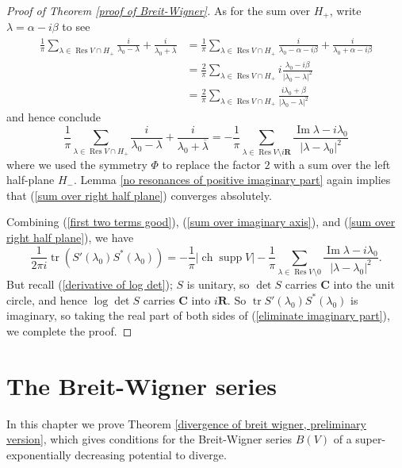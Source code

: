 \documentclass[12pt]{report}
\newcommand{\RR}{\mathbf{R}}
\newcommand{\CC}{\mathbf{C}}
\DeclareMathOperator{\ch}{ch}
\DeclareMathOperator{\Res}{Res}
\DeclareMathOperator{\supp}{supp}
\newcommand{\tr}{\operatorname{tr}}
\renewcommand{\Im}{\operatorname{Im}}
\theoremstyle{definition}
\begin{document}
\begin{proof}[Proof of Theorem \ref{proof of Breit-Wigner}]
As for the sum over $H_+$, write $\lambda = \alpha - i\beta$ to see
\begin{align*}
\frac{1}{\pi} \sum_{\lambda \in \Res V \cap H_+} \frac{i}{\lambda_0 - \lambda} + \frac{i}{\lambda_0 + \overline{\lambda}}
&= \frac{1}{\pi} \sum_{\lambda \in \Res V \cap H_+} \frac{i}{\lambda_0 - \alpha - i\beta} + \frac{i}{\lambda_0 + \alpha - i\beta}\\
&= \frac{2}{\pi} \sum_{\lambda \in \Res V \cap H_+} i\frac{\lambda_0 - i\beta}{|\lambda_0 - \lambda|^2}\\
&= \frac{2}{\pi} \sum_{\lambda \in \Res V \cap H_+} \frac{i\lambda_0 + \beta}{|\lambda_0 - \lambda|^2}
\end{align*}
and hence conclude
\begin{equation}
\label{sum over right half plane}
\frac{1}{\pi} \sum_{\lambda \in \Res V \cap H_+} \frac{i}{\lambda_0 - \lambda} + \frac{i}{\lambda_0 + \overline{\lambda}}
= -\frac{1}{\pi} \sum_{\lambda \in \Res V \setminus i\RR} \frac{\Im \lambda - i\lambda_0}{|\lambda - \lambda_0|^2}
\end{equation}
where we used the symmetry $\Phi$ to replace the factor $2$ with a sum over the left half-plane $H_-$.
Lemma \ref{no resonances of positive imaginary part} again implies that (\ref{sum over right half plane}) converges absolutely.

Combining (\ref{first two terms good}), (\ref{sum over imaginary axis}), and (\ref{sum over right half plane}), we have
\begin{equation}
\label{eliminate imaginary part}
\frac{1}{2\pi i}\tr(S'(\lambda_0)S^*(\lambda_0)) = -\frac{1}{\pi}|\ch \supp V| -\frac{1}{\pi} \sum_{\lambda \in \Res V \setminus 0} \frac{\Im \lambda - i\lambda_0}{|\lambda - \lambda_0|^2}.
   \end{equation}
But recall (\ref{derivative of log det}); $S$ is unitary, so $\det S$ carries $\CC$ into the unit circle, and hence $\log \det S$ carries $\CC$ into $i\RR$.
So $\tr S'(\lambda_0)S^*(\lambda_0)$ is imaginary, so taking the real part of both sides of (\ref{eliminate imaginary part}), we complete the proof.
\end{proof}


\chapter{The Breit-Wigner series}
\label{SED potentials chapter}
In this chapter we prove Theorem \ref{divergence of breit wigner, preliminary version}, which gives conditions for the Breit-Wigner series $B(V)$ of a super-exponentially decreasing potential to diverge.
\end{document}
